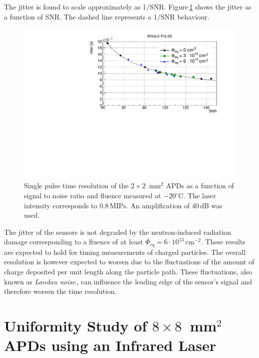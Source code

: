 \documentclass{article}
\begin{document}
The jitter is found to scale approximately as 1/SNR.
Figure\,\ref{fig:timeRes2x2_snr} shows the jitter as a function of SNR.
The dashed line represents a 1/SNR behaviour.

\begin{figure}
  \centering
  \includegraphics[width = 0.6 \textwidth]{timeRes2x2APDsNo1e15_SNR}
  \caption{Single pulse time resolution of the $2 \times 2$~mm$^2$ APDs as a function of signal to noise ratio and fluence measured at $-20^\circ$C. The laser intensity corresponds to 0.8\,MIPs. An amplification of 40\,dB was used.}
  \label{fig:timeRes2x2_snr}
\end{figure}

The jitter of the sensors is not degraded by the neutron-induced radiation damage corresponding to a fluence of at least $\Phi_{eq} = 6 \cdot 10^{13}$\,cm$^{-2}$.
These results are expected to hold for timing measurements of charged particles.
The overall resolution is however expected to worsen due to the fluctuations of the amount of charge deposited per unit length along the particle path.
These fluctuations, also known as {\em Landau noise}\,\cite{cartiglia2017}, can influence the leading edge of the sensor's signal and therefore worsen the time resolution.

\section{Uniformity Study of $8 \times 8$~mm$^2$ APDs using an Infrared Laser}
\label{sec:unif8x8laser}
\end{document}
